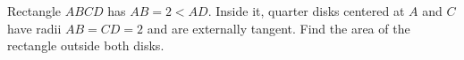 Rectangle $ABCD$ has $AB=2<AD$. Inside it, quarter disks centered at $A$ and $C$ have radii $AB=CD=2$ and are externally tangent. Find the area of the rectangle outside both disks.
